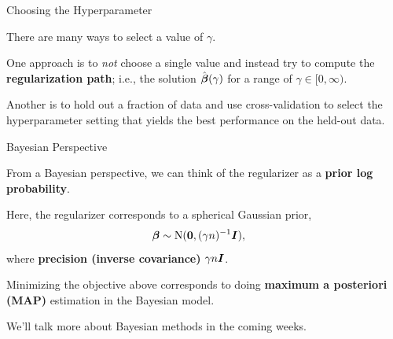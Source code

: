 \documentclass[aspectratio=169]{beamer}
\begin{document}
\begin{frame}[t,allowframebreaks]{Choosing the
Hyperparameter}\label{choosing-the-hyperparameter}

There are many ways to select a value of \(\gamma\). 

One approach is to \emph{not} choose a single value and instead try
to compute the \textbf{regularization path}; i.e., the solution
\(\hat{\boldsymbol{\beta}}(\gamma)\) for a range of \(\gamma \in [0, \infty)\).

Another is to hold out a fraction of data and use cross-validation to
select the hyperparameter setting that yields the best performance on
the held-out data.
\end{frame}

\begin{frame}[t,allowframebreaks]{Bayesian Perspective}\label{bayesian-perspective}

From a Bayesian perspective, we can think of the regularizer as a
\textbf{prior log probability}. 

Here, the regularizer corresponds to a spherical Gaussian prior, 
\begin{align*}
\boldsymbol{\beta} &\sim \mathrm{N}(\boldsymbol{0}, (\gamma n)^{-1} \boldsymbol{I}),
\end{align*} where \textbf{precision (inverse covariance)}
\(\gamma n \boldsymbol{I}\). 

Minimizing the objective above corresponds to doing
\textbf{maximum a posteriori (MAP)} estimation in the Bayesian model. 

We'll talk more about Bayesian methods in the coming weeks.
\end{frame}
\end{document}
